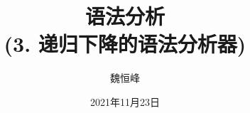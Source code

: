 \documentclass[]{beamer}
\title[语法分析]{语法分析 \\ (3. 递归下降的语法分析器)}
\author[魏恒峰]{\large 魏恒峰}
\institute{hfwei@nju.edu.cn}
\date{2021年11月23日}
\begin{document}
\maketitle



\thankyou{}

\end{document}
